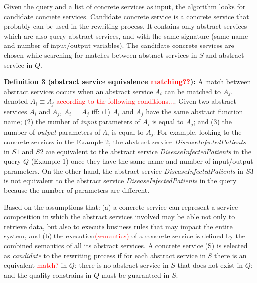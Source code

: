 Given the query and a list of concrete services as input, the algorithm looks for candidate concrete services. 
Candidate concrete service is a concrete service that probably can be used in the rewriting process. 
It contains only abstract services which are also query abstract services, and with the same signature (same name and number of input/output variables).
The candidate concrete services are chosen while searching for matches between abstract services in $S$ and abstract service in $Q$. 

\noindent \textbf{Definition 3 (abstract service equivalence \textcolor{red}{matching??}):} 
A match between abstract services occurs when an abstract service $A_{i}$ can be matched to $A_{j}$, denoted $A_{i} \equiv A_{j}$ \textcolor{red}{according to the following conditions...}. 
Given two abstract services $A_{i}$ and $A_{j}$, $A_{i}$ = $A_{j}$ iff: (1) $A_{i}$ and $A_{j}$ have the same abstract function name; (2) the number of \textit{input} parameters of $A_{i}$ is equal to $A_{j}$; and (3) the number of \textit{output} parameters of $A_{i}$ is equal to $A_{j}$. 
For example, looking to the concrete services in the Example 2, the abstract service \textit{DiseaseInfectedPatients} in $S1$ and $S2$ are equivalent to the abstract service \textit{DiseaseInfectedPatients} in the query $Q$ (Example 1) once they have the same name and number of input/output parameters.
On the other hand, the abstract service \textit{DiseaseInfectedPatients} in $S3$ is not equivalent to the abstract service \textit{DiseaseInfectedPatients} in the query because the number of parameters are different.



Based on the assumptions that: (a) a concrete service can represent a service composition in which the abstract services involved may be able not only to retrieve data, but also to execute business rules that may impact the entire system; and (b) the execution\textcolor{red}{(semantics)} of a concrete service is defined by the combined semantics of all its abstract services.  
A concrete service (S) is selected as \textit{candidate} to the rewriting process if for each abstract service in $S$ there is an equivalent \textcolor{red}{match?} in $Q$; there is no abstract service in $S$ that does not exist in $Q$; and the quality constrains in $Q$ must be guaranteed in $S$.

